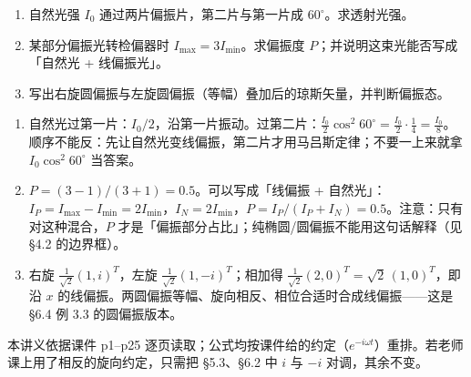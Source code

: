 \documentclass[11pt]{ctexart}
\begin{document}

\begin{enumerate}
\item 自然光强 $I_0$ 通过两片偏振片，第二片与第一片成 $60^\circ$。求透射光强。
\item 某部分偏振光转检偏器时 $I_{\max}=3I_{\min}$。求偏振度 $P$；并说明这束光能否写成「自然光 + 线偏振光」。
\item 写出右旋圆偏振与左旋圆偏振（等幅）叠加后的琼斯矢量，并判断偏振态。
\end{enumerate}


\begin{enumerate}
\item 自然光过第一片：$I_0/2$，沿第一片振动。过第二片：$\frac{I_0}{2}\cos^2 60^\circ=\frac{I_0}{2}\cdot\frac14=\frac{I_0}{8}$。顺序不能反：先让自然光变线偏振，第二片才用马吕斯定律；不要一上来就拿 $I_0\cos^2 60^\circ$ 当答案。
\item $P=(3-1)/(3+1)=0.5$。可以写成「线偏振 + 自然光」：$I_P=I_{\max}-I_{\min}=2I_{\min}$，$I_N=2I_{\min}$，$P=I_P/(I_P+I_N)=0.5$。注意：只有对这种混合，$P$ 才是「偏振部分占比」；纯椭圆/圆偏振不能用这句话解释（见 §4.2 的边界框）。
\item 右旋 $\frac{1}{\sqrt2}(1,i)^{T}$，左旋 $\frac{1}{\sqrt2}(1,-i)^{T}$；相加得 $\frac{1}{\sqrt2}(2,0)^{T}=\sqrt2\,(1,0)^{T}$，即沿 $x$ 的线偏振。两圆偏振等幅、旋向相反、相位合适时合成线偏振——这是 §6.4 例 3.3 的圆偏振版本。
\end{enumerate}

\flowerrule

{\small\color{inkgray} 本讲义依据课件 p1--p25 逐页读取；公式均按课件给的约定（$e^{-i\omega t}$）重排。若老师课上用了相反的旋向约定，只需把 §5.3、§6.2 中 $i$ 与 $-i$ 对调，其余不变。}
\end{document}
